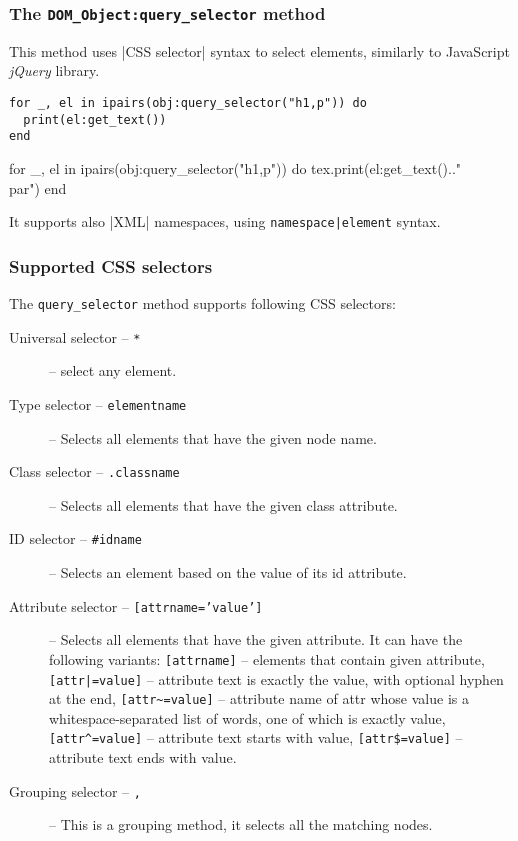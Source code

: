\documentclass{ltxdoc}
\begin{document}
\subsubsection{The \texttt{DOM\_Object:query\_selector} method}

This method uses |CSS selector| syntax to select elements, similarly to JavaScript \textit{jQuery} library.

\begin{verbatim}
for _, el in ipairs(obj:query_selector("h1,p")) do
  print(el:get_text())
end
\end{verbatim}


\begin{framed}
  \begin{luacode*}
for _, el in ipairs(obj:query_selector("h1,p")) do
  tex.print(el:get_text().."\\par")
end
  \end{luacode*}
\end{framed}

It supports also |XML| namespaces, using \verb_namespace|element_ syntax.

\subsubsection{Supported CSS selectors}\label{sec:css_selectors}

The \verb|query_selector| method supports following CSS selectors:

\begin{description}
  \item[Universal selector -- \texttt{*}] --  select any element.
  \item[Type selector -- \texttt{elementname}] -- Selects all elements that have the given node name.
  \item[Class selector -- \texttt{.classname}] -- Selects all elements that have the given class attribute.
  \item[ID selector -- \texttt{\#idname}] -- Selects an element based on the value of its id attribute. 
  \item[Attribute selector -- \texttt{[attrname='value']}] -- Selects all elements that have the given attribute.
    It can have the following variants: 
    \texttt{[attrname]} -- elements that contain given attribute, 
    \texttt{[attr\string|=value]} -- attribute text is exactly the value, with optional hyphen at the end,
    \verb|[attr~=value]| -- attribute name of attr whose value is a whitespace-separated list of words, one of which is exactly value,
    \verb|[attr^=value]| -- attribute text starts with value,
    \texttt{[attr\$=value]} -- attribute text ends with value.
  \item[Grouping selector -- \texttt{,}] -- This is a grouping method, it selects all the matching nodes.
\end{description}
\end{document}
